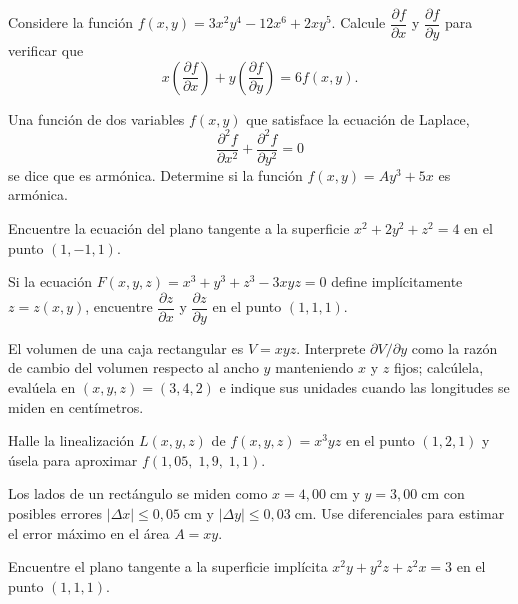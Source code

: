 \begin{prob}
Considere la función $f(x,y)=3x^2y^4-12x^6+2xy^5.$ Calcule $\dfrac{\partial f}{\partial x}$ y $\dfrac{\partial f}{\partial y}$ para verificar que \[  x\left( \dfrac{\partial f}{\partial x} \right)+y\left( \dfrac{\partial f}{\partial y} \right)=6f(x,y).\] 
\end{prob}

\begin{prob}
Una función de dos variables $f(x,y)$ que satisface la ecuación de Laplace, \[\dfrac{\partial^2f}{\partial x^2}+\dfrac{\partial^2f}{\partial y^2}=0\] se dice que es armónica. Determine si la función $f(x,y)=Ay^3+5x$ es armónica.
\end{prob}

\begin{prob}
Encuentre la ecuación del plano tangente a la superficie $x^2+2y^2+z^2=4$ en el punto $(1,-1,1).$
\end{prob}

\begin{prob}
Si la ecuación $F(x,y,z)=x^3+y^3+z^3-3xyz=0$ define implícitamente $z=z(x,y)$, encuentre
$\dfrac{\partial z}{\partial x}$ y $\dfrac{\partial z}{\partial y}$ en el punto $(1,1,1)$.
\end{prob}

\begin{prob}
El volumen de una caja rectangular es $V=xyz$. Interprete $\partial V/\partial y$
como la razón de cambio del volumen respecto al ancho $y$ manteniendo $x$ y $z$
fijos; calcúlela, evalúela en $(x,y,z)=(3,4,2)$ e indique sus unidades cuando
las longitudes se miden en centímetros.
\end{prob}

\begin{prob}
Halle la linealización $L(x,y,z)$ de $f(x,y,z)=x^3yz$ en el punto $(1,2,1)$ y
úsela para aproximar $f(1{,}05,\;1{,}9,\;1{,}1)$.
\end{prob}


\begin{prob}
Los lados de un rectángulo se miden como $x=4{,}00\;\text{cm}$ y $y=3{,}00\;\text{cm}$
con posibles errores $|\Delta x|\le 0{,}05\;\text{cm}$ y $|\Delta y|\le 0{,}03\;\text{cm}$.
Use diferenciales para estimar el error máximo en el área $A=xy$.
\end{prob}

\begin{prob}
Encuentre el plano tangente a la superficie implícita $x^2 y+y^2 z+z^2 x=3$ en el
punto $(1,1,1)$.
\end{prob}

